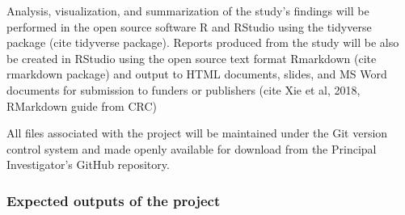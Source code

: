 \documentclass[]{article}
\begin{document}
Analysis, visualization, and summarization of the study's findings will
be performed in the open source software R and RStudio using the
tidyverse package (cite tidyverse package). Reports produced from the
study will be also be created in RStudio using the open source text
format Rmarkdown (cite rmarkdown package) and output to HTML documents,
slides, and MS Word documents for submission to funders or publishers
(cite Xie et al, 2018, RMarkdown guide from CRC)

All files associated with the project will be maintained under the Git
version control system and made openly available for download from the
Principal Investigator's GitHub repository.

\subsubsection{Expected outputs of the
project}\label{expected-outputs-of-the-project}
\end{document}
